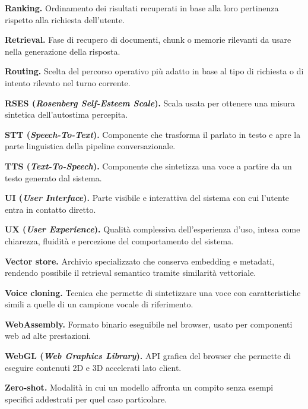 \textbf{Ranking.} Ordinamento dei risultati recuperati in base alla loro pertinenza rispetto alla richiesta dell'utente.

\textbf{Retrieval.} Fase di recupero di documenti, chunk o memorie rilevanti da usare nella generazione della risposta.

\textbf{Routing.} Scelta del percorso operativo più adatto in base al tipo di richiesta o di intento rilevato nel turno corrente.

\textbf{RSES (\emph{Rosenberg Self-Esteem Scale}).} Scala usata per ottenere una misura sintetica dell'autostima percepita.

\textbf{STT (\emph{Speech-To-Text}).} Componente che trasforma il parlato in testo e apre la parte linguistica della pipeline conversazionale.

\textbf{TTS (\emph{Text-To-Speech}).} Componente che sintetizza una voce a partire da un testo generato dal sistema.

\textbf{UI (\emph{User Interface}).} Parte visibile e interattiva del sistema con cui l'utente entra in contatto diretto.

\textbf{UX (\emph{User Experience}).} Qualità complessiva dell'esperienza d'uso, intesa come chiarezza, fluidità e percezione del comportamento del sistema.

\textbf{Vector store.} Archivio specializzato che conserva embedding e metadati, rendendo possibile il retrieval semantico tramite similarità vettoriale.

\textbf{Voice cloning.} Tecnica che permette di sintetizzare una voce con caratteristiche simili a quelle di un campione vocale di riferimento.

\textbf{WebAssembly.} Formato binario eseguibile nel browser, usato per componenti web ad alte prestazioni.

\textbf{WebGL (\emph{Web Graphics Library}).} API grafica del browser che permette di eseguire contenuti 2D e 3D accelerati lato client.

\textbf{Zero-shot.} Modalità in cui un modello affronta un compito senza esempi specifici addestrati per quel caso particolare.

\endgroup
